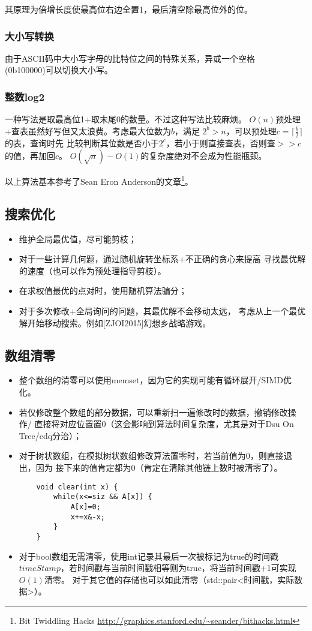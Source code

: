 其原理为倍增长度使最高位右边全置1，最后清空除最高位外的位。
\subsubsection{大小写转换}
由于ASCII码中大小写字母的比特位之间的特殊关系，异或一个空格\\(0b100000)可以切换大小写。

\subsubsection{整数log2}
一种写法是取最高位1+取末尾0的数量。不过这种写法比较麻烦。
$O(n)$预处理+查表虽然好写但又太浪费。考虑最大位数为$b$，满足
$2^b>n$，可以预处理$c=\lceil \frac{b}{2}\rceil$的表，查询时先
比较判断其位数是否小于$2^c$，若小于则直接查表，否则查$>>c$的值，再加回$c$。
$O(\sqrt{n})-O(1)$的复杂度绝对不会成为性能瓶颈。

以上算法基本参考了Sean Eron Anderson的文章\footnote{
    Bit Twiddling Hacks
    \url{http://graphics.stanford.edu/\~seander/bithacks.html}
}。
\subsection{搜索优化}
\begin{itemize}
    \item 维护全局最优值，尽可能剪枝；
    \item 对于一些计算几何题，通过随机旋转坐标系+不正确的贪心来提高
    寻找最优解的速度（也可以作为预处理指导剪枝）。
    \item 在求权值最优的点对时，使用随机算法骗分；
    \item 对于多次修改+全局询问的问题，其最优解不会移动太远，
    考虑从上一个最优解开始移动搜索。例如[ZJOI2015]幻想乡战略游戏。
\end{itemize}
\subsection{数组清零}
\begin{itemize}
    \item 整个数组的清零可以使用memset，因为它的实现可能有循环展开/SIMD优化。
    \item 若仅修改整个数组的部分数据，可以重新扫一遍修改时的数据，撤销修改操作/
    直接将对应位置置0（这会影响到算法时间复杂度，尤其是对于Dsu On Tree/cdq分治）；
    \item 对于树状数组，在模拟树状数组修改算法置零时，若当前值为0，则直接退出，因为
    接下来的值肯定都为0（肯定在清除其他链上数时被清零了）。
    \begin{lstlisting}
    void clear(int x) {
        while(x<=siz && A[x]) {
            A[x]=0;
            x+=x&-x;
        }
    }
    \end{lstlisting}
    \item 对于bool数组无需清零，使用int记录其最后一次被标记为true的时间戳
    $timeStamp$，若时间戳与当前时间戳相等则为true，将当前时间戳+1可实现$O(1)$清零。
    对于其它值的存储也可以如此清零（std::pair<时间戳，实际数据>）。
\end{itemize}
